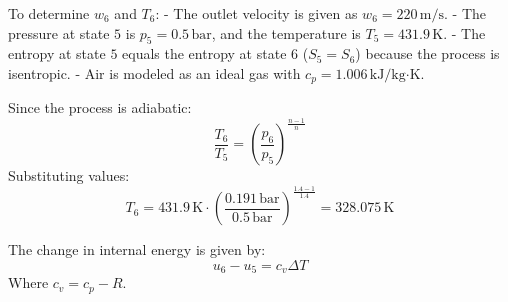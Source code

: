 To determine \( w_6 \) and \( T_6 \):  
- The outlet velocity is given as \( w_6 = 220 \, \text{m/s} \).  
- The pressure at state \( 5 \) is \( p_5 = 0.5 \, \text{bar} \), and the temperature is \( T_5 = 431.9 \, \text{K} \).  
- The entropy at state \( 5 \) equals the entropy at state \( 6 \) (\( S_5 = S_6 \)) because the process is isentropic.  
- Air is modeled as an ideal gas with \( c_p = 1.006 \, \text{kJ/kg·K} \).  

Since the process is adiabatic:  
\[
\frac{T_6}{T_5} = \left( \frac{p_6}{p_5} \right)^{\frac{n-1}{n}}
\]  
Substituting values:  
\[
T_6 = 431.9 \, \text{K} \cdot \left( \frac{0.191 \, \text{bar}}{0.5 \, \text{bar}} \right)^{\frac{1.4-1}{1.4}} = 328.075 \, \text{K}
\]  

The change in internal energy is given by:  
\[
u_6 - u_5 = c_v \Delta T
\]  
Where \( c_v = c_p - R \).